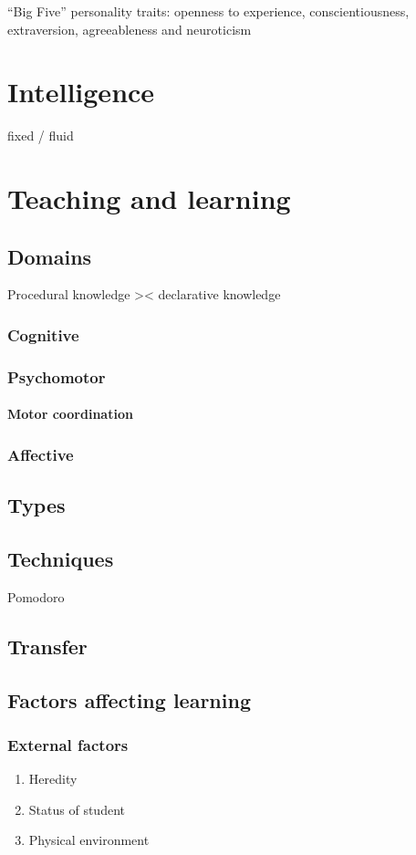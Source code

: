 \documentclass{report}
\begin{document}
“Big Five” personality traits: openness to experience, conscientiousness, extraversion, agreeableness and neuroticism
\chapter{Intelligence}
fixed / fluid
\chapter{Teaching and learning}
\section{Domains}
Procedural knowledge >< declarative knowledge
\subsection{Cognitive}
\subsection{Psychomotor}
\subsubsection{Motor coordination}
\subsection{Affective}
\section{Types}
\section{Techniques}
Pomodoro
\section{Transfer}
\section{Factors affecting learning}
\subsection{External factors}
\begin{enumerate}
\item Heredity
\item Status of student
\item Physical environment
\end{enumerate}
\end{document}
